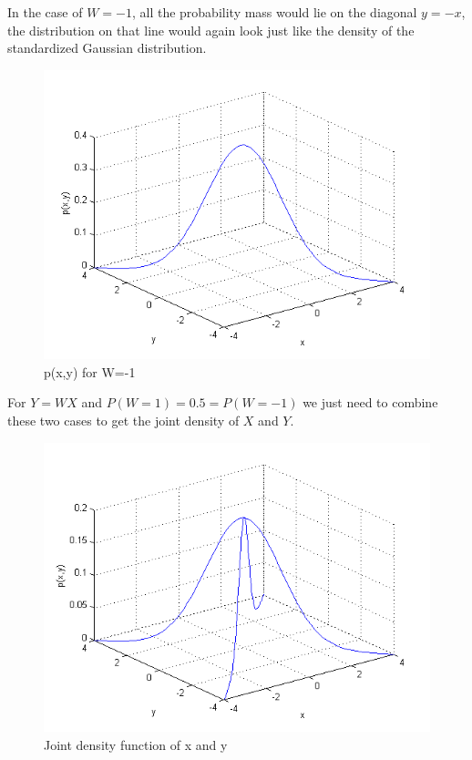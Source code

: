 \documentclass[paper=a4,fontsize=10pt,DIV11,BCOR10mm]{scrartcl}
\begin{document}
In the case of $W=-1$, all the probability mass would lie on the diagonal $y=-x$, the distribution on that line  would again look just like the density of the standardized Gaussian distribution.
\begin{figure}[htb]
\includegraphics[scale=0.6]{prob_dist_wneg.png}
\caption{p(x,y) for W=-1}
\end{figure}
\FloatBarrier

For $Y=WX$ and $P(W=1)=0.5=P(W=-1)$ we just need to combine these two cases to get the joint density of $X$ and $Y$.
\begin{figure}[htb]
\includegraphics[scale=0.6]{prob_dist.png} 
\caption{Joint density function of x and y}
\end{figure}
\FloatBarrier
\end{document}
